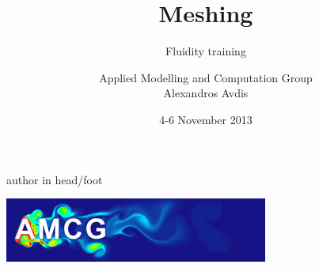 \documentclass[t]{beamer}
\author[Alexandros Avdis]{Applied Modelling and Computation Group\\[15pt]Alexandros Avdis}
\institute{Department of Earth Science and Engineering, Imperial College London}
\date{4-6 November 2013}
\title[Meshing]{Meshing}
\subtitle[]{Fluidity training}
\begin{document}
{
{%
\begin{beamercolorbox}[ht=.35cm,dp=0.2cm,wd=\textwidth,leftskip=.3cm]{author in head/foot}%
        \begin{minipage}[c]{5cm}%
        \end{minipage}\hfill%
        \begin{minipage}{6cm}
        \hfill\includegraphics[height=.5cm]{AMCGFlow-long}
        \end{minipage}
\end{beamercolorbox}%
}
\begin{frame}
\titlepage
\end{frame}
}
\end{document}
